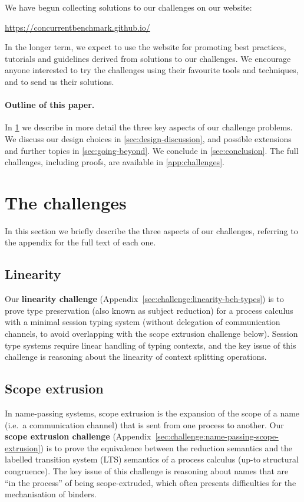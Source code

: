 \documentclass[runningheads]{llncs}
\begin{document}
We have begun collecting solutions to our challenges on our website:
%
\begin{center}
  \url{https://concurrentbenchmark.github.io/}
\end{center}
%
In the longer term, we expect to use the website for promoting best practices,
tutorials and guidelines derived from solutions to our challenges.
We encourage anyone interested to try the challenges using their
favourite tools and techniques, and to send us their solutions.

\paragraph{Outline of this paper.}
In \cref{sec:challenge-problems} we describe in more detail the three key
aspects of our challenge problems.  We discuss our design choices in
\cref{sec:design-discussion}, and possible extensions and further topics in
\cref{sec:going-beyond}.  We conclude in \cref{sec:conclusion}.
The full challenges, including proofs, are available in \cref{app:challenges}.

\section{The challenges}\label{sec:challenge-problems}
In this section we briefly describe the three aspects of our challenges, referring to the appendix for the full text of each one.

\subsection{Linearity}
Our \textbf{linearity challenge} (Appendix~\ref{sec:challenge:linearity-beh-types}) is to prove type preservation (also known as subject reduction) for a process calculus with a minimal
session typing system (without delegation of communication channels, to avoid overlapping with the scope
extrusion challenge below).
Session type systems require linear handling of typing contexts, and the key
issue of this challenge is reasoning about the linearity of context splitting operations.

\subsection{Scope extrusion}
In name-passing systems, scope extrusion is the expansion of the scope of a name (i.e.~a communication channel) that is sent from one process to another.
Our \textbf{scope extrusion challenge} (Appendix~\ref{sec:challenge:name-passing-scope-extrusion}) is to prove the equivalence between the reduction semantics and the labelled transition system (LTS) semantics of a process calculus (up-to structural congruence).
The key issue of this challenge is reasoning about names that are ``in the process'' of being scope-extruded, which often presents difficulties for the mechanisation of binders.
\end{document}
